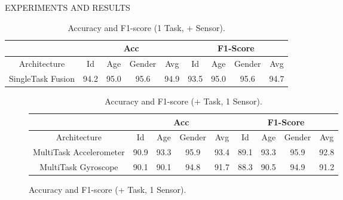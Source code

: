\documentclass[10pt]{beamer}
\begin{document}
\begin{frame}{EXPERIMENTS AND RESULTS}
\begin{minipage}{\linewidth}
\begin{minipage}{0.45\linewidth}
\begin{table}[h!]
\begin{adjustbox}{max width=\textwidth}
                \begin{tabular}{|c||ccc|c||ccc|c|}
                    \hline
                        & \multicolumn{4}{c||}{Acc} & \multicolumn{4}{c|}{F1-Score} \\
                    \hline
                        Architecture & Id & Age & Gender & Avg & Id & Age & Gender & Avg\\
                    \hline
                        SingleTask Fusion & 94.2 & 95.0 & 95.6 & 94.9 & 93.5 & 95.0 & 95.6 & 94.7\\
                    \hline 
                \end{tabular}
                \end{adjustbox}
                \caption{Accuracy and F1-score (1 Task, + Sensor).}
                \label{table accuracy and F1 (1 Task, + Sensor)}
            \end{table}
        \end{minipage}
        \hspace{0.05\linewidth}
        \begin{minipage}{0.45\linewidth}
            \begin{figure}[htbp]
                \centering
                \begin{table}[h!]
                    \centering
                    \begin{adjustbox}{max width=\textwidth}
                    \begin{tabular}{|c||ccc|c||ccc|c|}
                        \hline
                            & \multicolumn{4}{c||}{Acc} & \multicolumn{4}{c|}{F1-Score} \\
                        \hline
                            Architecture & Id & Age & Gender & Avg & Id & Age & Gender & Avg\\
                        \hline
                            MultiTask Accelerometer & 90.9 & 93.3 & 95.9 & 93.4 & 89.1 & 93.3 & 95.9 & 92.8\\
                            MultiTask Gyroscope & 90.1 & 90.1 & 94.8 & 91.7 & 88.3 & 90.5 & 94.9 & 91.2\\
                        \hline 
                    \end{tabular}
                    \end{adjustbox}
                    \caption{Accuracy and F1-score (+ Task, 1 Sensor).}
                    \label{table accuracy and F1 (more Task - 1 Sensor)}
                \end{table}

\end{figure}
\end{minipage}
\end{minipage}
\end{frame}
\end{document}
